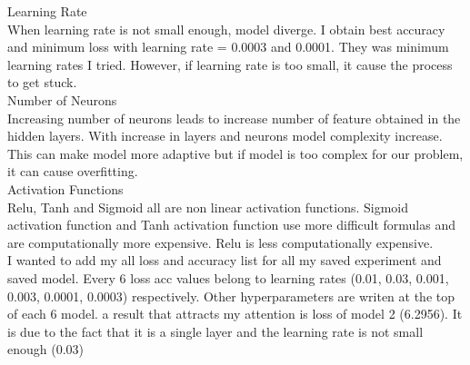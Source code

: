 \documentclass{article}
\begin{document}
Learning Rate\\

When learning rate is not small enough, model diverge. I obtain best accuracy and minimum loss with learning rate = 0.0003 and 0.0001. They was minimum learning rates I tried. However, if learning rate is too small, it cause the process to get stuck. \\

Number of Neurons \\ 
Increasing number of neurons leads to increase number of feature obtained in the hidden layers. With increase in layers and neurons model complexity increase. This can make model more adaptive but if model is too complex for our problem, it can cause overfitting.\\

Activation Functions \\
Relu, Tanh and Sigmoid all are non linear activation functions. Sigmoid activation function and Tanh activation function use more difficult formulas and are computationally more expensive. Relu is less computationally expensive.\\   

I wanted to add my all loss and accuracy list for all my saved experiment and saved model. Every 6 loss acc values belong to learning rates (0.01, 0.03, 0.001, 0.003, 0.0001, 0.0003) respectively. Other hyperparameters are writen at the top of each 6 model. a result that attracts my attention is loss of model 2 (6.2956). It is due to the fact that it is a single layer and the learning rate is not small enough (0.03)\\ \\
\end{document}

